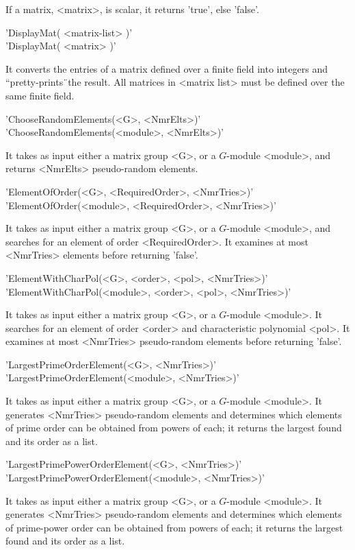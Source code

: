 If a matrix, <matrix>, is scalar, it returns 'true', else 'false'.

'DisplayMat( <matrix-list> )'\\
'DisplayMat( <matrix> )'

It converts  the entries of  a  matrix  defined over  a finite field into
integers and ``pretty-prints\"\ the result. All matrices in <matrix list>
must be defined over the same finite field.

'ChooseRandomElements(<G>, <NmrElts>)' \\
'ChooseRandomElements(<module>, <NmrElts>)' 

It takes  as input either a  matrix group <G>,  or a $G$-module <module>,
and returns <NmrElts> pseudo-random elements.

'ElementOfOrder(<G>, <RequiredOrder>, <NmrTries>)'\\
'ElementOfOrder(<module>, <RequiredOrder>, <NmrTries>)'

It  takes as input  either a matrix group  <G>, or a $G$-module <module>,
and searches for an  element of order   <RequiredOrder>.  It examines  at
most <NmrTries> elements before returning 'false'.

'ElementWithCharPol(<G>, <order>, <pol>, <NmrTries>)'\\
'ElementWithCharPol(<module>, <order>, <pol>, <NmrTries>)'

It takes  as input either a matrix  group <G>, or  a $G$-module <module>.
It searches for an element of order <order> and characteristic polynomial
<pol>.  It examines  at  most  <NmrTries> pseudo-random elements   before
returning 'false'.

'LargestPrimeOrderElement(<G>, <NmrTries>)'\\
'LargestPrimeOrderElement(<module>, <NmrTries>)'

It takes as  input either a matrix group  <G>, or a  $G$-module <module>.
It  generates   <NmrTries> pseudo-random elements   and  determines which
elements of prime  order can be obtained from  powers of each; it returns
the largest found and its order as a list.

'LargestPrimePowerOrderElement(<G>, <NmrTries>)' \\
'LargestPrimePowerOrderElement(<module>, <NmrTries>)' 

It takes  as input either  a matrix group  <G>, or a $G$-module <module>.
It generates  <NmrTries>  pseudo-random  elements  and  determines  which
elements  of prime-power order  can be obtained  from  powers of each; it
returns the largest found and its order as a list.


